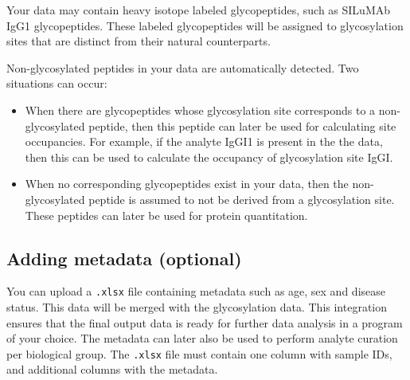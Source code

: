 \begin{optionalbox}
	Your data may contain heavy isotope labeled glycopeptides, such as SILuMAb IgG1 glycopeptides.
	These labeled glycopeptides will be assigned to glycosylation sites that are distinct from their natural counterparts.
\end{optionalbox}

Non-glycosylated peptides in your data are automatically detected. Two situations can occur:

\begin{itemize}[topsep=0pt, itemsep=0pt]
	\item 
	When there are glycopeptides whose glycosylation site corresponds to a non-glycosylated peptide, then this peptide can later be used for calculating site occupancies. 
	For example, if the analyte \textsf{IgGI1} is present in the the data, then this can be used to calculate the occupancy of glycosylation site \textsf{IgGI}.
	\item 
	When no corresponding glycopeptides exist in your data, then the non-glycosylated peptide is assumed to not be derived from a glycosylation site.
	These peptides can later be used for protein quantitation.
\end{itemize}
	

\subsection{Adding metadata (optional)}
You can upload a \texttt{.xlsx} file containing metadata such as age, sex and disease status.
This data will be merged with the glycosylation data.
This integration ensures that the final output data is ready for further data analysis in a program of your choice.
The metadata can later also be used to perform analyte curation per biological group.
The \texttt{.xlsx} file must contain one column with sample IDs, and additional columns with the metadata.




